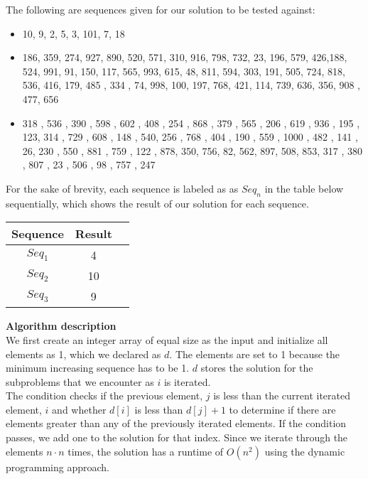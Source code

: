 \documentclass[11pt]{article}
\begin{document}
The following are sequences given for our solution to be tested against:
\begin{itemize}
\item 10, 9, 2, 5, 3, 101, 7, 18
\item 186, 359, 274,  927,  890,  520,  571,  310,  916,  798,  732,  23, 196, 579,
426,188,  524,  991,   91,  150,  117,  565,  993,  615,   48, 811,  594,  303,  191,
505,  724,  818,  536,  416,  179,  485 , 334  , 74,  998,  100,  197,  768,  421,
114,  739,  636,  356,  908 , 477,  656
\item 318 ,  536  , 390  , 598  , 602 ,  408  , 254  , 868 ,  379  , 565  ,  206  ,  619  ,  936  ,  195 ,
 123, 314  ,  729 ,  608  , 148 ,  540,   256 ,  768 ,  404  ,  190  ,  559 ,  1000 ,   482  ,  141 ,  26,
  230  ,  550  ,  881  ,  759  ,  122 ,   878,    350,    756,     82,    562,    897,    508,    853,    317 ,
  380 ,   807 ,    23 ,   506  ,   98 ,   757 ,   247
\end{itemize}
For the sake of brevity, each sequence is labeled as as $Seq_{n}$ in the table below sequentially, which shows the result of our solution for each sequence.
\begin{center}
    \begin{tabular}{|c|c|p{10cm}|}
        \hline
            Sequence & Result \\
        \hline
             $Seq_{1}$ & 4  \\
        \hline
             $Seq_{2}$ & 10  \\
        \hline
             $Seq_{3}$ & 9  \\
        \hline
    \end{tabular}
\end{center}
\vspace{2mm}
{\Large \textbf{Algorithm description}}
\vspace{3mm} \\
We first create an integer array of equal size as the input and initialize all elements as 1, which we declared as $d$. The elements are set to 1 because the minimum increasing sequence has to be 1. $d$ stores the solution for the subproblems that we encounter as $i$ is iterated.
\vspace{2mm} \\
The condition checks if the previous element, $j$ is less than the current iterated element, $i$ and whether $d[i]$ is less than $d[j] + 1$ to determine if there are elements greater than any of the previously iterated elements. If the condition passes, we add one to the solution for that index.
Since we iterate through the elements $n \cdot n$ times, the solution has a runtime of \(O(n^{2})\) using the dynamic programming approach.
\end{document}
